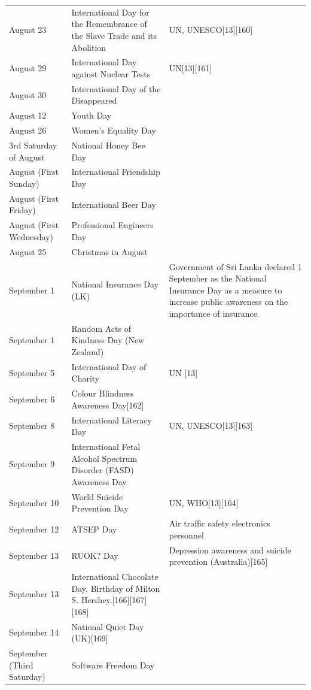 \documentclass[
  openany]{book}
\begin{document}
\begin{longtable}[t]{>{\raggedright\arraybackslash}p{8em}>{\raggedright\arraybackslash}p{20em}>{\raggedright\arraybackslash}p{12em}}
\rowcolor{gray!6}  August 23 & International Day for the Remembrance of the Slave Trade and its Abolition & UN, UNESCO[13][160]\\
August 29 & International Day against Nuclear Tests & UN[13][161]\\
\rowcolor{gray!6}  August 30 & International Day of the Disappeared & \\
\addlinespace
August 12 & Youth Day & \\
\rowcolor{gray!6}  August 26 & Women's Equality Day & \\
3rd Saturday of August & National Honey Bee Day & \\
\rowcolor{gray!6}  August (First Sunday) & International Friendship Day & \\
August (First Friday) & International Beer Day & \\
\addlinespace
\rowcolor{gray!6}  August (First Wednesday) & Professional Engineers Day & \\
August 25 & Christmas in August & \\
\rowcolor{gray!6}  September 1 & National Insurance Day (LK) & Government of Sri Lanka declared 1 September as the National Insurance Day as a measure to increase public awareness on the importance of insurance.\\
September 1 & Random Acts of Kindness Day (New Zealand) & \\
\rowcolor{gray!6}  September 5 & International Day of Charity & UN [13]\\
\addlinespace
September 6 & Colour Blindness Awareness Day[162] & \\
\rowcolor{gray!6}  September 8 & International Literacy Day & UN, UNESCO[13][163]\\
September 9 & International Fetal Alcohol Spectrum Disorder (FASD) Awareness Day & \\
\rowcolor{gray!6}  September 10 & World Suicide Prevention Day & UN, WHO[13][164]\\
September 12 & ATSEP Day & Air traffic safety electronics personnel\\
\addlinespace
\rowcolor{gray!6}  September 13 & RUOK? Day & Depression awareness and suicide prevention (Australia)[165]\\
September 13 & International Chocolate Day, Birthday of Milton S. Hershey.[166][167][168] & \\
\rowcolor{gray!6}  September 14 & National Quiet Day (UK)[169] & \\
September (Third Saturday) & Software Freedom Day & \\

\end{longtable}
\end{document}
